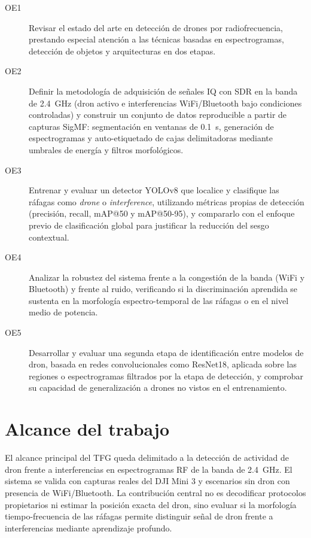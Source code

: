 \begin{description}
  \item[OE1] Revisar el estado del arte en detección de drones por radiofrecuencia, prestando especial atención a las técnicas basadas en espectrogramas, detección de objetos y arquitecturas en dos etapas.
  \item[OE2] Definir la metodología de adquisición de señales IQ con SDR en la banda de \SI{2.4}{\giga\hertz} (dron activo e interferencias WiFi/Bluetooth bajo condiciones controladas) y construir un conjunto de datos reproducible a partir de capturas SigMF: segmentación en ventanas de \SI{0.1}{\second}, generación de espectrogramas y auto-etiquetado de cajas delimitadoras mediante umbrales de energía y filtros morfológicos.
  \item[OE3] Entrenar y evaluar un detector YOLOv8 que localice y clasifique las ráfagas como \emph{drone} o \emph{interference}, utilizando métricas propias de detección (precisión, recall, mAP@50 y mAP@50-95), y compararlo con el enfoque previo de clasificación global para justificar la reducción del sesgo contextual.
  \item[OE4] Analizar la robustez del sistema frente a la congestión de la banda (WiFi y Bluetooth) y frente al ruido, verificando si la discriminación aprendida se sustenta en la morfología espectro-temporal de las ráfagas o en el nivel medio de potencia.
  \item[OE5] Desarrollar y evaluar una segunda etapa de identificación entre modelos de dron, basada en redes convolucionales como ResNet18, aplicada sobre las regiones o espectrogramas filtrados por la etapa de detección, y comprobar su capacidad de generalización a drones no vistos en el entrenamiento.
\end{description}

\section{Alcance del trabajo}
\label{sec:alcance}

El alcance principal del TFG queda delimitado a la detección de actividad de dron frente a interferencias en espectrogramas RF de la banda de \SI{2.4}{\giga\hertz}. El sistema se valida con capturas reales del DJI Mini 3 y escenarios sin dron con presencia de WiFi/Bluetooth. La contribución central no es decodificar protocolos propietarios ni estimar la posición exacta del dron, sino evaluar si la morfología tiempo-frecuencia de las ráfagas permite distinguir señal de dron frente a interferencias mediante aprendizaje profundo.

